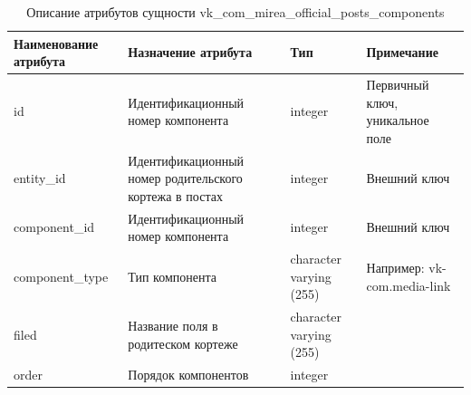 \documentclass{mirea}
\begin{document}
	\begin{longtable}{ |p{}|p{}|p{}|p{}| } 
		\caption{Описание атрибутов сущности vk\_com\_mirea\_official\_posts\_components}
		\endfirsthead
		\endhead
		\hline
		Наименование атрибута & Назначение атрибута & Тип & Примечание \\ \hline
		
		id & Идентификацион\-ный номер компонента & integer & Первичный ключ, уникальное поле \\ \hline
		
		entity\_id & Идентификацион\-ный номер родительского кортежа в постах & integer & Внешний ключ \\ \hline
		
		component\_id & Идентификацион\-ный номер компонента & integer & Внешний ключ \\ \hline
		
		component\_type & Тип компонента & character varying (255) & Например: vk-com.media-link \\ \hline
		
		filed & Название поля в родитеском кортеже & character varying (255) & \\ \hline
		
		order & Порядок компонентов & integer & \\ \hline	
		
	\end{longtable}
	
\end{document}
